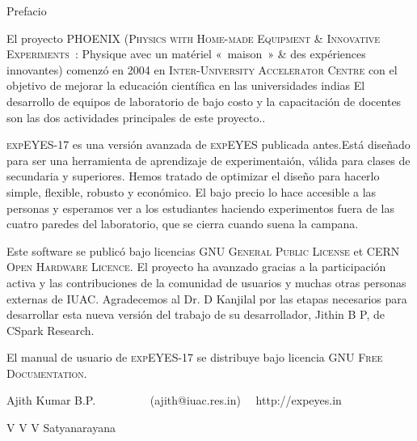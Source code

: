 \documentclass[12pt,a4paper]{report}
\begin{document}
\thispagestyle{empty}

Prefacio

El proyecto PHOENIX (\textsc{Physics with Home-made Equipment \& Innovative
Experiments}~: Physique avec un matériel «~maison~» \& des expériences
innovantes) comenzó en 2004 en \textsc{Inter-University Accelerator
Centre} con el objetivo de mejorar la educación científica en las 
universidades indias El desarrollo de equipos de laboratorio 
de bajo costo y la capacitación de docentes son las dos actividades 
principales de este proyecto..

\textsc{expEYES-17} es una versión avanzada de \textsc{expEYES} publicada
antes.Está diseñado para ser una herramienta de aprendizaje de experimentaión, 
válida para clases de secundaria y superiores. Hemos tratado de optimizar el 
diseño para hacerlo simple, flexible, robusto y económico.
El bajo precio lo hace accesible a las personas y esperamos ver a los estudiantes 
haciendo experimentos fuera de las cuatro paredes del laboratorio, que se cierra 
cuando suena la campana.

Este software se publicó bajo licencias \textsc{GNU General Public
License} et \textsc{CERN Open Hardware Licence}. El proyecto ha avanzado 
gracias a la participación activa y las contribuciones de la comunidad de usuarios 
y muchas otras personas externas de \textsc{IUAC}.
Agradecemos al Dr. D Kanjilal por las etapas necesarios para desarrollar 
esta nueva versión del trabajo de su desarrollador, Jithin B P, de CSpark Research.

El manual de usuario de \textsc{expEYES-17} se distribuye bajo 
licencia \textsc{GNU Free Documentation}.

Ajith Kumar B.P. ~~~~~~~~~(ajith@iuac.res.in) ~~http://expeyes.in

V V V Satyanarayana
\end{document}
